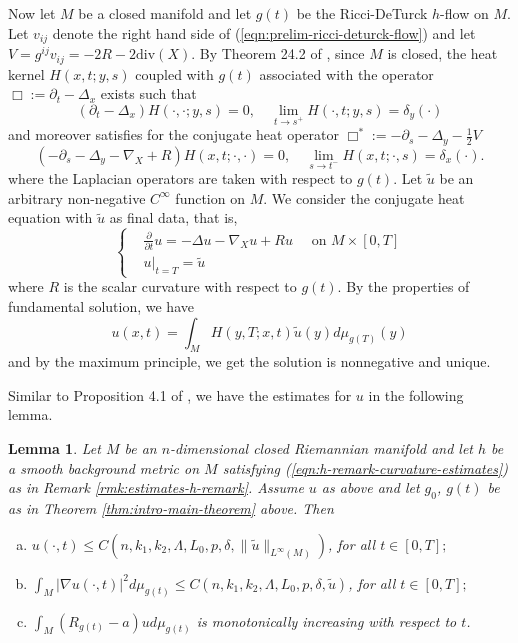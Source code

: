 \documentclass[12pt]{amsart}
\theoremstyle{plain}
\theoremstyle{plain}
\newtheorem{lemma}[subsection]{Lemma}
\theoremstyle{definition}
\theoremstyle{remark}
\numberwithin{equation}{subsection}
\newcommand{\del}{\nabla}
\begin{document}
Now let $M$ be a closed manifold and let $g(t)$ be the Ricci-DeTurck $h$-flow on $M$. Let $v_{ij}$ denote the right hand side of (\ref{eqn:prelim-ricci-deturck-flow}) and let $V = g^{ij}v_{ij} = -2R - 2\text{div}(X)$. By Theorem 24.2 of \cite{chow_ricci_2010}, since $M$ is closed, the heat kernel $H(x,t;y,s)$ coupled with  $g(t)$ associated with the operator $\Box:= \partial_t - \Delta_x$ exists such that
\begin{equation*}
    \left(\partial_t - \Delta_x\right)H(\cdot,\cdot;y,s) = 0, \quad \lim\limits_{t\to s^+}H(\cdot,t;y,s) = \delta_y(\cdot)
\end{equation*}
and moreover satisfies for the conjugate heat operator $\Box^\ast:= -\partial_s - \Delta_y - \frac{1}{2}V$
\begin{equation*}
    \left(-\partial_s - \Delta_y - \del_X + R\right)H(x,t;\cdot,\cdot) = 0, \quad \lim\limits_{s\to t^-}H(x,t;\cdot,s) = \delta_x(\cdot).
\end{equation*}
where the Laplacian operators are taken with respect to $g(t)$. Let $\tilde{u}$ be an arbitrary non-negative $C^\infty$ function on $M$. We consider the conjugate heat equation with $\tilde{u}$ as final data, that is,
\begin{equation}\label{eqn:conjugate-heat-eqn}
    \begin{cases}
        &\frac{\partial}{\partial t} u = -\Delta u - \del_X u + Ru \quad \text{ on } M \times[0,T] \\
        &u\big|_{t=T} = \tilde{u}
    \end{cases}
\end{equation}
where $R$ is the scalar curvature with respect to $g(t)$. By the properties of fundamental solution, we have
\begin{equation*}
    u(x,t) = \int_M H(y,T;x,t)\tilde{u}(y)d\mu_{g(T)}(y)
\end{equation*}
and by the maximum principle, we get the solution is nonnegative and unique.

Similar to Proposition 4.1 of \cite{jiang_weak_2021}, we have the estimates for $u$ in the following lemma.
\begin{lemma}\label{lem:conjugate-heat-equation-estimates}
    Let $M$ be an $n$-dimensional closed Riemannian manifold and let $h$ be a smooth background metric on $M$ satisfying (\ref{eqn:h-remark-curvature-estimates}) as in Remark \ref{rmk:estimates-h-remark}. Assume $u$ as above and let $g_0$, $g(t)$ be as in Theorem \ref{thm:intro-main-theorem} above. Then
    \begin{enumerate}[(a)]
        \item $u(\cdot,t) \leq C(n,k_1,k_2,\Lambda,L_0,p,\delta,\lVert\tilde{u}\rVert_{L^\infty(M)})$, for all $t \in [0,T];$
        \item $\int_M |\del u(\cdot,t)|^2 d\mu_{g(t)} \leq C(n,k_1,k_2,\Lambda,L_0,p,\delta,\tilde{u})$, for all $t \in [0,T];$
        \item $\int_M (R_{g(t)} - a)u d\mu_{g(t)}$ is monotonically increasing with respect to $t$.
    \end{enumerate}
\end{lemma}
\end{document}
